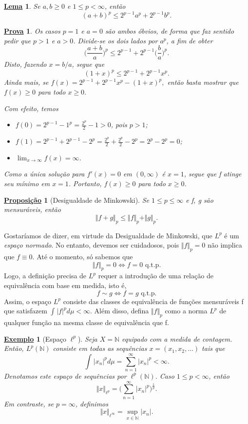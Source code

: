 \documentclass{article}
\newtheorem*{lemma*}{\underline{Lema}}
\newtheorem*{prop*}{\underline{Proposi\c c\~ao}}
\newtheorem{example}{\underline{Exemplo}}
\newtheorem*{proof*}{\underline{Prova}}
\begin{document}
 \begin{lemma*}
   Se \(a, b\geq 0\) e \(1\leq p < \infty\), então 
     \[
       (a+b)^{p} \leq 2^{p-1}a^{p} + 2^{p-1}b^{p}.
     \]
 \end{lemma*}
\begin{proof*}
  Os casos \(p=1\) e \(a=0\) são ambos óbvios, de forma que faz sentido pedir que \(p > 1\) e \(a > 0\). Divide-se os dois lados por \(a^{p}\), a fim de obter 
    \[
      \biggl(\frac{a+b}{a}\biggr)^{p}\leq 2^{p-1} + 2^{p-1}\biggl(\frac{b}{a}\biggr)^{p}.
    \]
  Disto, fazendo \(x=b/a\), segue que 
    \[
      (1+x)^{p}\leq 2^{p-1} + 2^{p-1}x^{p}.
    \]
  Ainda mais, se \(f(x) = 2^{p-1} + 2^{p-1}x^{p}-(1+x)^{p},\) então basta mostrar que \(f(x)\geq 0\) para todo \(x\geq 0\). 

  Com efeito, temos 
 \begin{itemize}
   \item \(f(0) = 2^{p-1}-1^{p} = \frac{2^{p}}{2}-1 > 0\), pois \(p>1\); 
   \item \(f(1) = 2^{p-1} + 2^{p-1} - 2^{p} = \frac{2^{p}}{2} + \frac{2^{p}}{2} - 2^{p} = 2^{p}-2^{p} = 0\);
   \item \(\lim_{x\to \infty}f(x) = \infty\).
 \end{itemize}
 Como a única solução para \(f'(x) = 0\) em \((0, \infty)\) é \(x=1\), segue que f atinge seu mínimo em \(x=1\). Portanto, \(f(x)\geq 0\) para todo \(x\geq 0\).
\end{proof*}
\hypertarget{minkowski}{
  \begin{prop*}[Desigualdade de Minkowski]
   Se \(1\leq p\leq \infty\) e f, g são mensuráveis, então 
     \[
       \Vert f + g \Vert_{p}\leq \Vert f \Vert_{p} + \Vert g \Vert_{p}.
     \]
 \end{prop*}
}
  Gostaríamos de dizer, em virtude da Desigualdade de Minkowski, que \(L^{p}\) é um \textit{espaço normado}. No entanto, devemos ser cuidadosos, pois \(\Vert f \Vert_{p} = 0\) não implica que \(f\equiv 0\). Até o momento, só sabemos que 
    \[
      \Vert f \Vert_{p} = 0 \Longleftrightarrow f = 0 \text{ q.t.p.}
    \]
  Logo, a definição precisa de \(L^{p}\) requer a introdução de uma relação de equivalência com base em medida, isto é,
    \[
      f\sim g \Longleftrightarrow f = g \text{ q.t.p.}
    \]
  Assim, o espaço \(L^{p}\) consiste das classes de equivalência de funções mensuráveis f que satisfazem \(\int_{}^{}|f|^{p}d\mu <\infty.\) Além disso, defina \(\Vert f \Vert_{p}\) como a norma \(L^{p}\) de qualquer função 
  na mesma classe de equivalência que f.
\begin{example}[Espaço \(\ell ^{p}\)]
  Seja \(X = \mathbb{N}\) equipado com a medida de contagem. Então, \(L^{p}(\mathbb{N})\) consiste em todas as sequências \(x=(x_1, x_2, \dotsc )\) tais que 
    \[
      \int_{}^{}|x_{n}|^{p}d\mu = \sum\limits_{n=1}^{\infty}|x_{n}|^{p}<\infty.
    \]
  Denotamos este espaço de sequências por \(\ell ^{p}(\mathbb{N})\). Caso \(1\leq p < \infty\), então 
    \[
      \Vert x \Vert_{\ell ^{p}} = \biggl(\sum\limits_{n=1}^{\infty}|x_{n}|^{p}\biggr)^{\frac{1}{p}}.
    \]
  Em contraste, se \(p = \infty\), definimos 
    \[
      \Vert x \Vert_{\ell ^{\infty}} = \sup_{x\in \mathbb{N}}|x_{n}|.
    \]
 \end{example}
\end{document}
